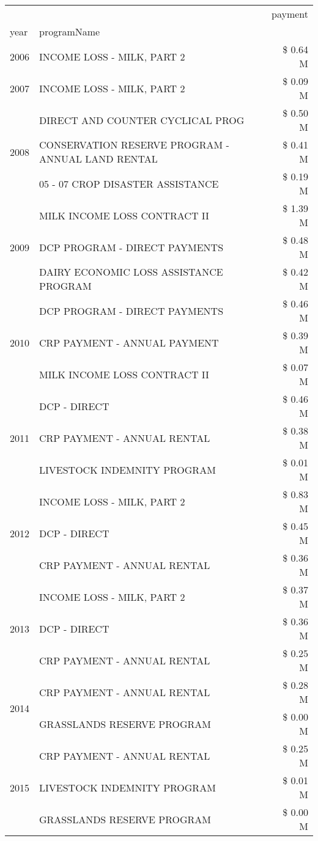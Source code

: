 \begin{tabular}{llr}
\toprule
 &  & payment \\
year & programName &  \\
\midrule
2006 & INCOME LOSS - MILK, PART 2 & \$ 0.64 M \\
\cline{1-3}
2007 & INCOME LOSS - MILK, PART 2 & \$ 0.09 M \\
\cline{1-3}
\multirow[t]{3}{*}{2008} & DIRECT AND COUNTER CYCLICAL PROG & \$ 0.50 M \\
 & CONSERVATION RESERVE PROGRAM - ANNUAL LAND RENTAL & \$ 0.41 M \\
 & 05 - 07 CROP DISASTER ASSISTANCE & \$ 0.19 M \\
\cline{1-3}
\multirow[t]{3}{*}{2009} & MILK INCOME LOSS CONTRACT II & \$ 1.39 M \\
 & DCP PROGRAM - DIRECT PAYMENTS & \$ 0.48 M \\
 & DAIRY ECONOMIC LOSS ASSISTANCE PROGRAM & \$ 0.42 M \\
\cline{1-3}
\multirow[t]{3}{*}{2010} & DCP PROGRAM - DIRECT PAYMENTS & \$ 0.46 M \\
 & CRP PAYMENT - ANNUAL PAYMENT & \$ 0.39 M \\
 & MILK INCOME LOSS CONTRACT II & \$ 0.07 M \\
\cline{1-3}
\multirow[t]{3}{*}{2011} & DCP - DIRECT & \$ 0.46 M \\
 & CRP PAYMENT - ANNUAL RENTAL & \$ 0.38 M \\
 & LIVESTOCK INDEMNITY PROGRAM & \$ 0.01 M \\
\cline{1-3}
\multirow[t]{3}{*}{2012} & INCOME LOSS - MILK, PART 2 & \$ 0.83 M \\
 & DCP - DIRECT & \$ 0.45 M \\
 & CRP PAYMENT - ANNUAL RENTAL & \$ 0.36 M \\
\cline{1-3}
\multirow[t]{3}{*}{2013} & INCOME LOSS - MILK, PART 2 & \$ 0.37 M \\
 & DCP - DIRECT & \$ 0.36 M \\
 & CRP PAYMENT - ANNUAL RENTAL & \$ 0.25 M \\
\cline{1-3}
\multirow[t]{2}{*}{2014} & CRP PAYMENT - ANNUAL RENTAL & \$ 0.28 M \\
 & GRASSLANDS RESERVE PROGRAM & \$ 0.00 M \\
\cline{1-3}
\multirow[t]{3}{*}{2015} & CRP PAYMENT - ANNUAL RENTAL & \$ 0.25 M \\
 & LIVESTOCK INDEMNITY PROGRAM & \$ 0.01 M \\
 & GRASSLANDS RESERVE PROGRAM & \$ 0.00 M \\

\end{tabular}
